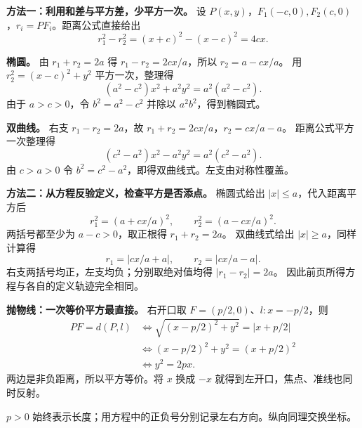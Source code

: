 \begin{proofbox}
\textbf{方法一：利用和差与平方差，少平方一次。}
设 $P(x,y)$，$F_1(-c,0),F_2(c,0)$，$r_i=PF_i$。距离公式直接给出
\[
 r_1^2-r_2^2=(x+c)^2-(x-c)^2=4cx.
\]

\textbf{椭圆。} 由 $r_1+r_2=2a$ 得 $r_1-r_2=2cx/a$，所以 $r_2=a-cx/a$。
用 $r_2^2=(x-c)^2+y^2$ 平方一次，整理得
\[
 (a^2-c^2)x^2+a^2y^2=a^2(a^2-c^2).
\]
由于 $a>c>0$，令 $b^2=a^2-c^2$ 并除以 $a^2b^2$，得到椭圆式。

\textbf{双曲线。} 右支 $r_1-r_2=2a$，故 $r_1+r_2=2cx/a$，$r_2=cx/a-a$。
距离公式平方一次整理得
\[
 (c^2-a^2)x^2-a^2y^2=a^2(c^2-a^2).
\]
由 $c>a>0$ 令 $b^2=c^2-a^2$，即得双曲线式。左支由对称性覆盖。
\end{proofbox}
\clearpage
\begin{proofbox}
\textbf{方法二：从方程反验定义，检查平方是否添点。}
椭圆式给出 $|x|\le a$，代入距离平方后
\[
 r_1^2=(a+cx/a)^2,\qquad r_2^2=(a-cx/a)^2.
\]
两括号都至少为 $a-c>0$，取正根得 $r_1+r_2=2a$。
双曲线式给出 $|x|\ge a$，同样计算得
\[
 r_1=|cx/a+a|,\qquad r_2=|cx/a-a|.
\]
右支两括号均正，左支均负；分别取绝对值均得 $|r_1-r_2|=2a$。
因此前页所得方程与各自的定义轨迹完全相同。

\medskip
\textbf{抛物线：一次等价平方最直接。}
右开口取 $F=(p/2,0)$、$l:x=-p/2$，则
\[
 \begin{aligned}
 PF=d(P,l)&\iff \sqrt{(x-p/2)^2+y^2}=|x+p/2|\\
 &\iff (x-p/2)^2+y^2=(x+p/2)^2\\
 &\iff y^2=2px.
 \end{aligned}
\]
两边是非负距离，所以平方等价。将 $x$ 换成 $-x$ 就得到左开口，焦点、准线也同时反射。

$p>0$ 始终表示长度；用方程中的正负号分别记录左右方向。纵向同理交换坐标。
\end{proofbox}
\clearpage
